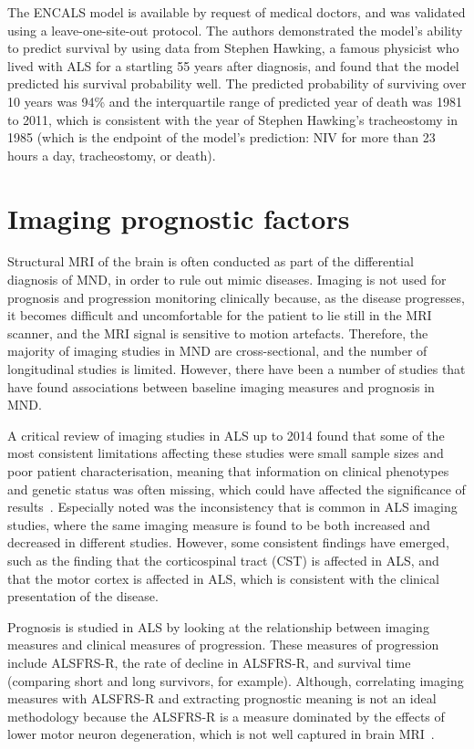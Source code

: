 The ENCALS model is available by request of medical doctors, and was validated using a leave-one-site-out protocol.
The authors demonstrated the model's ability to predict survival by using data from Stephen Hawking, a famous physicist who lived with ALS for a startling 55 years after diagnosis, and found that the model predicted his survival probability well.
The predicted probability of surviving over 10 years was 94\% and the interquartile range of predicted year of death was 1981 to 2011, which is consistent with the year of Stephen Hawking's tracheostomy in 1985 (which is the endpoint of the model's prediction: NIV for more than 23 hours a day, tracheostomy, or death).




\section{Imaging prognostic factors}

Structural MRI of the brain is often conducted as part of the differential diagnosis of MND, in order to rule out mimic diseases.
Imaging is not used for prognosis and progression monitoring clinically because, as the disease progresses, it becomes difficult and uncomfortable for the patient to lie still in the MRI scanner, and the MRI signal is sensitive to motion artefacts.
Therefore, the majority of imaging studies in MND are cross-sectional, and the number of longitudinal studies is limited.
However, there have been a number of studies that have found associations between baseline imaging measures and prognosis in MND.

A critical review of imaging studies in ALS up to 2014 found that some of the most consistent limitations affecting these studies were small sample sizes and poor patient characterisation, meaning that information on clinical phenotypes and genetic status was often missing, which could have affected the significance of results~\cite{bedeLessonsALSImaging2014}.
Especially noted was the inconsistency that is common in ALS imaging studies, where the same imaging measure is found to be both increased and decreased in different studies.
However, some consistent findings have emerged, such as the finding that the corticospinal tract (CST) is affected in ALS, and that the motor cortex is affected in ALS, which is consistent with the clinical presentation of the disease.

Prognosis is studied in ALS by looking at the relationship between imaging measures and clinical measures of progression.
These measures of progression include ALSFRS-R, the rate of decline in ALSFRS-R, and survival time (comparing short and long survivors, for example).
Although, correlating imaging measures with ALSFRS-R and extracting prognostic meaning is not an ideal methodology because the ALSFRS-R is a measure dominated by the effects of lower motor neuron degeneration, which is not well captured in brain MRI~\cite{bedeLessonsALSImaging2014}.

